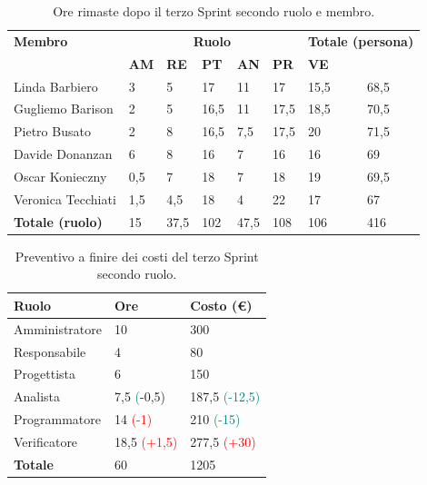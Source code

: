 \begin{table}[ht!]
	\centering
	\begin{tabular}{p{3cm} p{1.4cm} p{1.6cm} p{1.5cm} p{1.5cm} p{1.5cm} p{1.5cm} p{2cm}}
		\toprule
        \textbf{Membro} & \multicolumn{5}{c}{\textbf{Ruolo}} & \multicolumn{2}{r}{\textbf{Totale (persona)}}\\
		& \textbf{AM} & \textbf{RE} & \textbf{PT} & \textbf{AN} & \textbf{PR} & \textbf{VE}\\
		\midrule
        Linda Barbiero     & 3 & 5 & 17 & 11   & 17 & 15,5 & 68,5 \\
        Gugliemo Barison   & 2 & 5 & 16,5 & 11   & 17,5 & 18,5 & 70,5 \\
        Pietro Busato      & 2 & 8 & 16,5 & 7,5 & 17,5 & 20 & 71,5 \\
        Davide Donanzan    & 6 & 8 & 16 & 7   & 16 & 16 & 69 \\
        Oscar Konieczny    & 0,5 & 7 & 18 & 7   & 18 & 19 & 69,5 \\
        Veronica Tecchiati & 1,5 & 4,5 & 18 & 4   & 22 & 17 & 67 \\
        \midrule
        \textbf{Totale (ruolo)} & 15 & 37,5 & 102 & 47,5 & 108 & 106 & 416 \\
		\bottomrule
	\end{tabular}
	\caption{Ore rimaste dopo il terzo Sprint secondo ruolo e membro.}
	\label{table:Ore rimaste dopo il terzo Sprint secondo ruolo e membro.}
\end{table}
\begin{table}[ht!]
    \centering
    \begin{tabular}{p{4cm} p{1.8cm} p{2.2cm}}
        \toprule
        \textbf{Ruolo} & \textbf{Ore} & \textbf{Costo (€)} \\
        \midrule
        Amministratore & 10 & 300 \\
        Responsabile & 4  & 80 \\
        Progettista & 6  & 150 \\
        Analista & 7,5 \textcolor{teal}(-0,5) & 187,5 \textcolor{teal}{(-12,5)}\\
        Programmatore & 14 \textcolor{red}{(-1)} & 210 \textcolor{teal}{(-15)}\\
        Verificatore & 18,5 \textcolor{red}{(+1,5)} & 277,5 \textcolor{red}{(+30)} \\
        \bottomrule
        \textbf{Totale} & 60 & 1205
    \end{tabular}
    \caption{Preventivo a finire dei costi del terzo Sprint secondo ruolo.}
    \label{table:Preventivo a finire dei costi del terzo Sprint secondo ruolo}
\end{table}

